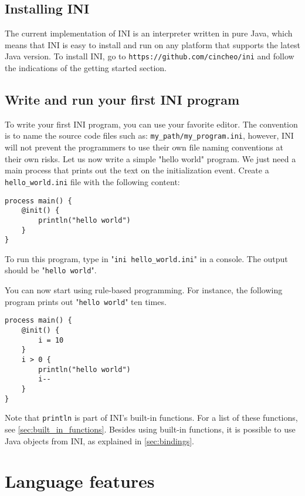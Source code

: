 \documentclass[11pt]{article}
\begin{document}
\subsection{Installing INI}

The current implementation of INI is an interpreter written in pure Java, which means that INI is easy to install and run on any platform that supports the latest Java version. To install INI, go to \texttt{https://github.com/cincheo/ini} and follow the indications of the getting started section.

\subsection{Write and run your first INI program}

To write your first INI program, you can use your favorite editor. The convention is to name the source code files such as: \texttt{my\_path/my\_program.ini}, however, INI will not prevent the programmers to use their own file naming conventions at their own risks. Let us now write a simple "hello world" program. We just need a main process that prints out the text on the initialization event. Create a \texttt{hello\_world.ini} file with the following content:

\begin{lstlisting}
process main() {
	@init() {
		println("hello world")
	}
}
\end{lstlisting}

To run this program, type in "\texttt{ini hello\_world.ini}" in a console. The output should be "\texttt{hello world}".

You can now start using rule-based programming. For instance, the following program prints out "\texttt{hello world}" ten times.

\begin{lstlisting}
process main() {
	@init() {
		i = 10
	}
	i > 0 {
		println("hello world")
		i--
	}
}
\end{lstlisting}

Note that \texttt{println} is part of INI's built-in functions. For a list of these functions, see \ref{sec:built_in_functions}. Besides using built-in functions, it is possible to use Java objects from INI, as explained in \ref{sec:bindings}.

\section{Language features}
\end{document}
